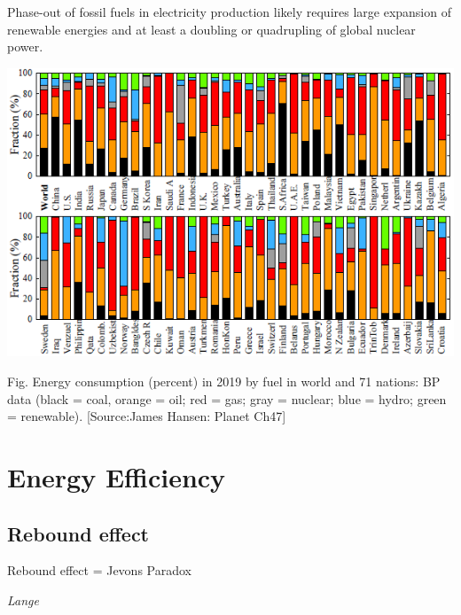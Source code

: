 \documentclass[
]{book}
\begin{document}
Phase-out of fossil fuels in electricity production likely requires large expansion of renewable
energies and at least a doubling or quadrupling of global nuclear power.

\includegraphics{fig/Energy_Consumption_by_Fuel_2019_World_and_71_Countries_James_Hansen_PlanetCh47.png}

Fig. Energy consumption (percent) in 2019 by fuel in world and 71 nations: BP data
(black = coal, orange = oil; red = gas; gray = nuclear; blue = hydro; green = renewable).
{[}Source:James Hansen: Planet Ch47{]}

\hypertarget{energy-efficiency}{%
\section{Energy Efficiency}\label{energy-efficiency}}

\hypertarget{rebound-effect}{%
\subsection{Rebound effect}\label{rebound-effect}}

Rebound effect = Jevons Paradox

\emph{Lange}
\end{document}
